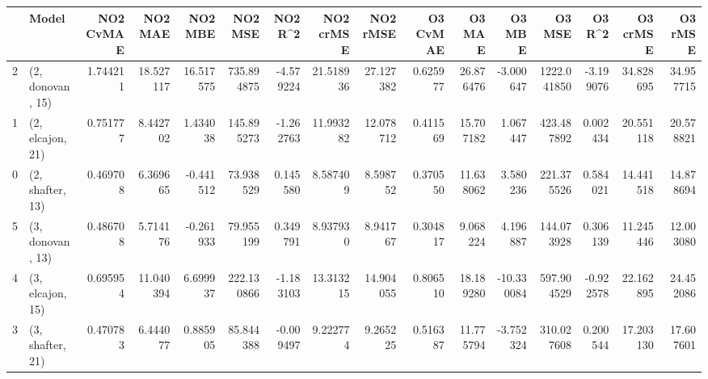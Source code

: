 \begin{tabular}{llrrrrrrrrrrrrrr}
\toprule
{} &             Model &  NO2 CvMAE &    NO2 MAE &    NO2 MBE &     NO2 MSE &   NO2 R\textasciicircum2 &  NO2 crMSE &   NO2 rMSE &  O3 CvMAE &     O3 MAE &     O3 MBE &       O3 MSE &    O3 R\textasciicircum2 &   O3 crMSE &    O3 rMSE \\
\midrule
2 &  (2, donovan, 15) &   1.744211 &  18.527117 &  16.517575 &  735.894875 & -4.579224 &  21.518936 &  27.127382 &  0.625977 &  26.876476 &  -3.000647 &  1222.041850 & -3.199076 &  34.828695 &  34.957715 \\
1 &  (2, elcajon, 21) &   0.751777 &   8.442702 &   1.434038 &  145.895273 & -1.262763 &  11.993282 &  12.078712 &  0.411569 &  15.707182 &   1.067447 &   423.487892 &  0.002434 &  20.551118 &  20.578821 \\
0 &  (2, shafter, 13) &   0.469708 &   6.369665 &  -0.441512 &   73.938529 &  0.145580 &   8.587409 &   8.598752 &  0.370550 &  11.638062 &   3.580236 &   221.375526 &  0.584021 &  14.441518 &  14.878694 \\
5 &  (3, donovan, 13) &   0.486708 &   5.714176 &  -0.261933 &   79.955199 &  0.349791 &   8.937930 &   8.941767 &  0.304817 &   9.068224 &   4.196887 &   144.073928 &  0.306139 &  11.245446 &  12.003080 \\
4 &  (3, elcajon, 15) &   0.695954 &  11.040394 &   6.699937 &  222.130866 & -1.183103 &  13.313215 &  14.904055 &  0.806510 &  18.189280 & -10.330084 &   597.904529 & -0.922578 &  22.162895 &  24.452086 \\
3 &  (3, shafter, 21) &   0.470783 &   6.444077 &   0.885905 &   85.844388 & -0.009497 &   9.222774 &   9.265225 &  0.516387 &  11.775794 &  -3.752324 &   310.027608 &  0.200544 &  17.203130 &  17.607601 \\
\bottomrule
\end{tabular}
